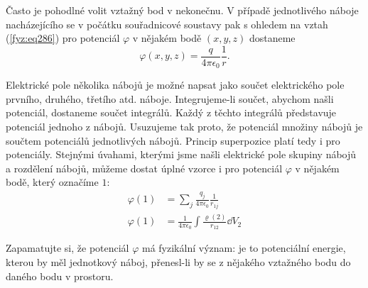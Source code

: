 {    Často je pohodlné volit vztažný	bod v nekonečnu. V případě jednotlivého	náboje nacházejícího se 
    v počátku souřadnicové soustavy pak s ohledem	na vztah (\ref{fyz:eq286}) pro 
    potenciál 
    \(\varphi\) v nějakém bodě \((x, y, z)\) dostaneme
    \begin{equation}\label{fyz:fey_eq_elstat23}
     \varphi(x, y, z) = \frac{q}{4\pi\epsilon_0}\frac{1}{r}. 
    \end{equation}

    Elektrické pole několika nábojů je možné napsat jako součet elektrického pole prvního, druhého, 
    třetího atd. náboje. Integrujeme-li součet, abychom našli potenciál, dostaneme součet 
    integrálů. Každý z těchto integrálů představuje potenciál jednoho z nábojů. Usuzujeme tak 
    proto, že potenciál množiny nábojů je součtem potenciálů jednotlivých nábojů. Princip 
    superpozice platí tedy i pro potenciály. Stejnými úvahami, kterými jsme našli elektrické pole 
    skupiny nábojů a rozdělení nábojů, můžeme dostat úplné vzorce i pro potenciál \(\varphi\) v 
    nějakém bodě, který označíme \(1\):
    \begin{align}
     \varphi(1) &= 
       \sum\limits_{j}\frac{q_j}{4\pi\epsilon_0}\frac{1}{r_{1j}}     \label{fyz:fey_eq_elstat24} \\ 
     \varphi(1) &= 
       \frac{1}{4\pi\epsilon_0}\int\frac{\varrho(2)}{r_{12}}\dd{V_2} \label{fyz:fey_eq_elstat25}
    \end{align}
     	    
    Zapamatujte si, že potenciál \(\varphi\) má fyzikální význam: je to potenciální energie, kterou 
    by měl jednotkový náboj, přenesl-li by se z nějakého vztažného bodu do daného bodu v prostoru.
    
}

